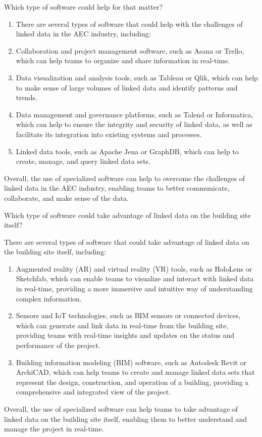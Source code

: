 \begin{description}
	\me Which type of software could help for that matter?
	\gpt
	\begin{enumerate}
		\item There are several types of software that could help with the challenges of linked data in the AEC industry, including:
		\item Collaboration and project management software, such as Asana or Trello, which can help teams to organize and share information in real-time.
		\item Data visualization and analysis tools, such as Tableau or Qlik, which can help to make sense of large volumes of linked data and identify patterns and trends.
		\item Data management and governance platforms, such as Talend or Informatica, which can help to ensure the integrity and security of linked data, as well as facilitate its integration into existing systems and processes.
		\item Linked data tools, such as Apache Jena or GraphDB, which can help to create, manage, and query linked data sets.
	\end{enumerate}
	Overall, the use of specialized software can help to overcome the challenges of linked data in the AEC industry, enabling teams to better communicate, collaborate, and make sense of the data.

	\me Which type of software could take advantage of linked data on the building site itself?

	\gpt There are several types of software that could take advantage of linked data on the building site itself, including:
	\begin{enumerate}
		\item Augmented reality (AR) and virtual reality (VR) tools, such as HoloLens or Sketchfab, which can enable teams to visualize and interact with linked data in real-time, providing a more immersive and intuitive way of understanding complex information.
		\item Sensors and IoT technologies, such as BIM sensors or connected devices, which can generate and link data in real-time from the building site, providing teams with real-time insights and updates on the status and performance of the project.
		\item Building information modeling (BIM) software, such as Autodesk Revit or ArchiCAD, which can help teams to create and manage linked data sets that represent the design, construction, and operation of a building, providing a comprehensive and integrated view of the project.
	\end{enumerate}
	Overall, the use of specialized software can help teams to take advantage of linked data on the building site itself, enabling them to better understand and manage the project in real-time.


\end{description}
